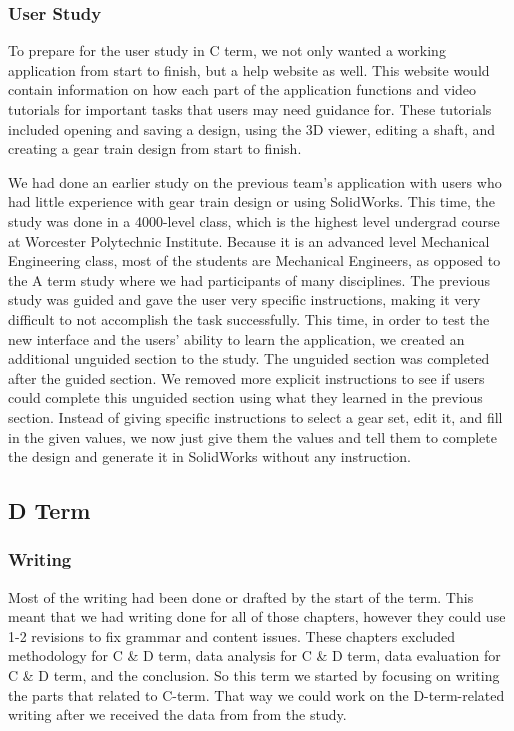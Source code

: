 \begin{doublespace}
\subsubsection{User Study}

To prepare for the user study in C term, we not only wanted a working application from start to finish, but a help website as well. This website would contain information on how each part of the application functions and video tutorials for important tasks that users may need guidance for. These tutorials included opening and saving a design, using the 3D viewer, editing a shaft, and creating a gear train design from start to finish.

We had done an earlier study on the previous team's application with users who had little experience with gear train design or using SolidWorks. This time, the study was done in a 4000-level class, which is the highest level undergrad course at Worcester Polytechnic Institute. Because it is an advanced level Mechanical Engineering class, most of the students are Mechanical Engineers, as opposed to the A term study where we had participants of many disciplines. The previous study was guided and gave the user very specific instructions, making it very difficult to not accomplish the task successfully. This time, in order to test the new interface and the users' ability to learn the application, we created an additional unguided section to the study. The unguided section was completed after the guided section. We removed more explicit instructions to see if users could complete this unguided section using what they learned in the previous section. Instead of giving specific instructions to select a gear set, edit it, and fill in the given values, we now just give them the values and tell them to complete the design and generate it in SolidWorks without any instruction.

\subsection{D Term}

\subsubsection{Writing}

Most of the writing had been done or drafted by the start of the term. This meant that we had writing done for all of those chapters, however they could use 1-2 revisions to fix grammar and content issues. These chapters excluded methodology for C \& D term, data analysis for C \& D term, data evaluation for C \& D term, and the conclusion. So this term we started by focusing on writing the parts that related to C-term. That way we could work on the D-term-related writing after we received the data from from the study.


\end{doublespace}
